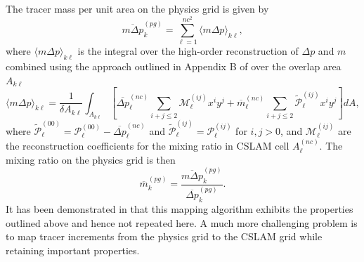 The tracer mass per unit area on the physics grid is given by
\begin{equation}
\overline{m\Delta p}^{(pg)}_k=\sum_{\ell=1}^{nc^2}\langle m\Delta p\rangle_{k\ell},
\end{equation}
where $\langle m\Delta p\rangle_{k\ell}$ is the integral over the high-order reconstruction of $\Delta p$ and $m$ combined using the approach outlined in Appendix B of \cite{NL2010JCP} over the overlap area $A_{k\ell}$
\begin{equation}
\langle m\Delta p\rangle_{k\ell}=\frac{1}{\delta A_{k\ell}}\int_{A_{k\ell}}\left[ \overline{\Delta p}_\ell^{(nc)}\sum_{i+j\le 2}{\mathcal{M}}^{(ij)}_\ell x^{i}y^{j}+{\overline{m}}_\ell^{(nc)}\sum_{i+j\le 2}{\widetilde{{\mathcal{P}}}}^{(ij)}_\ell x^{i}y^{j}\right] dA,
\end{equation}
where ${\widetilde{{\mathcal{P}}}}^{(00)}_\ell={\mathcal{P}}^{(00)}_\ell-\overline{\Delta p}^{(nc)}_\ell$ and ${\widetilde{{\mathcal{P}}}}^{(ij)}_\ell={\mathcal{P}}^{(ij)}_\ell$ for $i,j>0$, and ${\mathcal{M}}^{(ij)}_\ell$ are the reconstruction coefficients for the mixing ratio in CSLAM cell $A^{(nc)}_\ell$. The mixing ratio on the physics grid is then
\begin{equation}
\overline{m}^{(pg)}_k=\frac{\overline{m\Delta p}^{(pg)}_k}{\overline{\Delta p}^{(pg)}_k}.
\end{equation}
It has been demonstrated in  \cite{LNU2010JCP} that this mapping algorithm exhibits the properties outlined above and hence not repeated here. A much more challenging problem is to map tracer increments from the physics grid to the CSLAM grid while retaining important properties.
